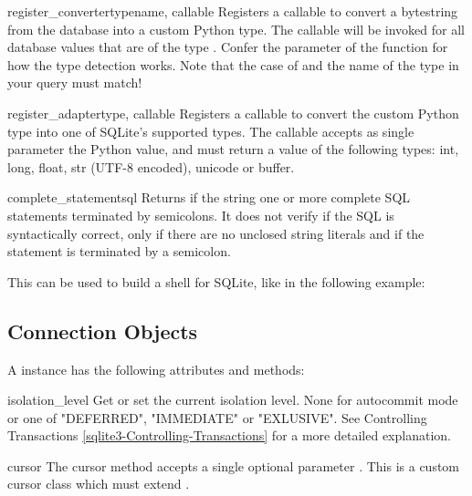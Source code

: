 \begin{funcdesc}{register_converter}{typename, callable}
Registers a callable to convert a bytestring from the database into a custom
Python type. The callable will be invoked for all database values that are of
the type . Confer the parameter  of the
 function for how the type detection works. Note that the case of
 and the name of the type in your query must match!
\end{funcdesc}

\begin{funcdesc}{register_adapter}{type, callable}
Registers a callable to convert the custom Python type  into one of
SQLite's supported types. The callable  accepts as single
parameter the Python value, and must return a value of the following types:
int, long, float, str (UTF-8 encoded), unicode or buffer.
\end{funcdesc}

\begin{funcdesc}{complete_statement}{sql}
Returns  if the string  one or more complete SQL
statements terminated by semicolons. It does not verify if the SQL is
syntactically correct, only if there are no unclosed string literals and if the
statement is terminated by a semicolon.

This can be used to build a shell for SQLite, like in the following example:

    
\end{funcdesc}

\subsection{Connection Objects \label{sqlite3-Connection-Objects}}

A  instance has the following attributes and methods:

\label{sqlite3-Connection-IsolationLevel}
\begin{memberdesc}{isolation_level}
  Get or set the current isolation level. None for autocommit mode or one of
  "DEFERRED", "IMMEDIATE" or "EXLUSIVE". See  Controlling Transactions
  \ref{sqlite3-Controlling-Transactions} for a more detailed explanation.
\end{memberdesc}

\begin{methoddesc}{cursor}{}
  The cursor method accepts a single optional parameter .
  This is a custom cursor class which must extend .
\end{methoddesc}

